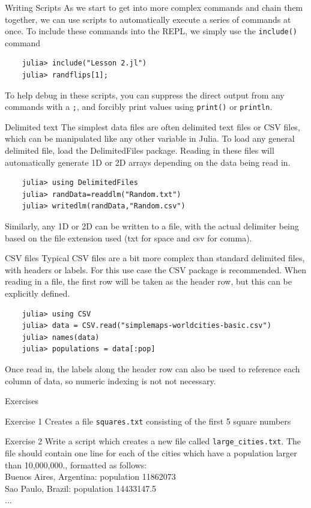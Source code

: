\documentclass{beamer}
\begin{document}
\begin{frame}[fragile]{Writing Scripts}
	As we start to get into more complex commands and chain them together, we can use scripts to automatically execute a series of commands at once. To include these commands into the REPL, we simply use the \verb|include()| command 
	\begin{lstlisting}
	julia> include("Lesson 2.jl")
	julia> randflips[1];
	\end{lstlisting}
	To help debug in these scripts, you can suppress the direct output from any commands with a \verb|;|, and forcibly print values using \verb|print()| or \verb|println|.
\end{frame}

\begin{frame}[fragile]{Delimited text}
	The simplest data files are often delimited text files or CSV files, which can be manipulated like any other variable in Julia. To load any general delimited file, load the DelimitedFiles package. Reading in these files will automatically generate 1D or 2D arrays depending on the data being read in.
	\begin{lstlisting}
	julia> using DelimitedFiles
	julia> randData=readdlm("Random.txt")
	julia> writedlm(randData,"Random.csv")
	\end{lstlisting}
	Similarly, any 1D or 2D can be written to a file, with the actual delimiter being based on the file extension used (txt for space and csv for comma).
\end{frame}

\begin{frame}[fragile]{CSV files}
	Typical CSV files are a bit more complex than standard delimited files, with headers or labels. For this use case the CSV package is recommended. When reading in a file, the first row will be taken as the header row, but this can be explicitly defined.
	\begin{lstlisting}
	julia> using CSV
	julia> data = CSV.read("simplemaps-worldcities-basic.csv")
	julia> names(data)
	julia> populations = data[:pop]
	\end{lstlisting}
	Once read in, the labels along the header row can also be used to reference each column of data, so numeric indexing is not not necessary.
\end{frame}

\begin{frame}[fragile]{Exercises}
	\begin{block}{Exercise 1}
		Creates a file \verb|squares.txt| consisting of the first 5 square numbers
	\end{block}
	\begin{block}{Exercise 2}
		Write a script which creates a new file called \verb|large_cities.txt|.
		The file should contain one line for each of the cities which have a
		population larger than 10,000,000., formatted as follows:\\
		Buenos Aires, Argentina: population 11862073\\
		Sao Paulo, Brazil: population 14433147.5\\
		...
	\end{block}
\end{frame}
\end{document}
